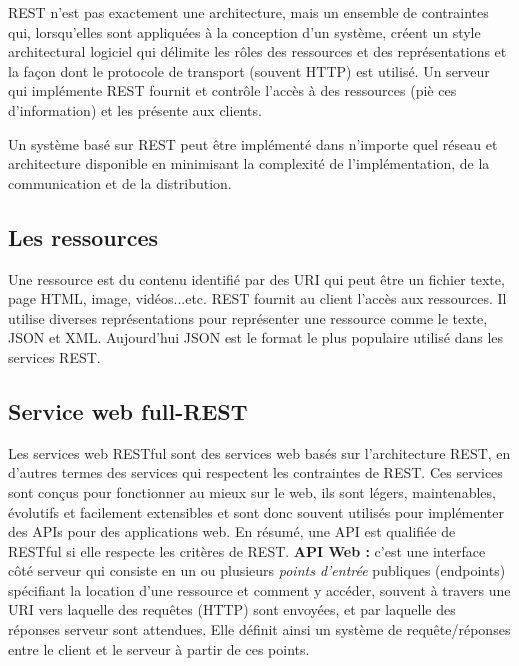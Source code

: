 REST n'est pas exactement une architecture, mais un ensemble de contraintes qui, lorsqu'elles sont appliquées à la conception d'un système, créent un style architectural logiciel qui délimite les rôles des ressources et des représentations et la façon dont le protocole de transport (souvent HTTP) est utilisé. 
Un serveur qui implémente REST fournit et contrôle l'accès à des ressources (piè 	ces d'information) et les présente aux clients.
			
Un système basé sur REST peut être implémenté dans n'importe quel réseau et architecture disponible en minimisant la complexité de l'implémentation, de la communication et de la distribution.\cite{richardson2008restful}

\subsection{Les ressources}
Une ressource est du contenu identifié par des URI  qui peut être un fichier texte, page HTML, image, vidéos...etc.
REST fournit au client l'accès aux ressources. Il utilise diverses représentations pour représenter une ressource comme le texte, JSON et XML. Aujourd'hui JSON est le format le plus populaire utilisé dans les services REST.

\subsection{Service web full-REST}
Les services web RESTful sont des services web basés sur l'architecture REST, en d'autres termes des services qui respectent les contraintes de REST.
Ces services sont conçus pour fonctionner au mieux sur le web, ils sont légers, maintenables, évolutifs et facilement extensibles et sont donc souvent utilisés pour implémenter des APIs pour des applications web.\cite{refTutorialPointsREST}
\newline 
En résumé, une API est qualifiée de RESTful si elle respecte les critères de REST.
\newline
\newline
\textbf{API Web :} c'est une interface côté serveur qui consiste en un ou plusieurs \emph{points d'entrée} publiques (endpoints) spécifiant la location d'une ressource et comment y accéder, souvent à travers une URI vers laquelle des requêtes (HTTP) sont envoyées, et par laquelle des réponses serveur sont attendues.
Elle définit ainsi un système de requête/réponses entre le client et le serveur à partir de ces points.

